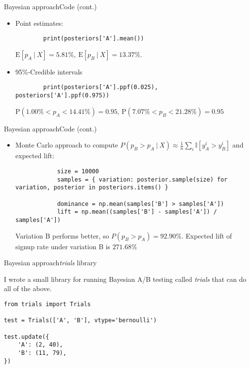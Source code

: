 \documentclass[pdf]{beamer}
\begin{document}
\begin{frame}[fragile]{Bayesian approach}{Code (cont.)}
	
	\begin{itemize}
	\item Point estimates:
	
	\begin{lstlisting}
		print(posteriors['A'].mean())
	\end{lstlisting}
	
	$ \text{E}[p_A~|~X] = 5.81\%,\ \text{E}[p_B~|~X] = 13.37\% $.
	
	\vspace{.5cm}
	
	\item 95\%-Credible intervals
	
	\begin{lstlisting}
		print(posteriors['A'].ppf(0.025), posteriors['A'].ppf(0.975))
	\end{lstlisting}
	
	$ \text{P}(1.00\% < p_A < 14.41\%) = 0.95 $, $\text{P}(7.07\% < p_B < 21.28\%) = 0.95 $
	
	\end{itemize}
	
\end{frame}


\begin{frame}[fragile]{Bayesian approach}{Code (cont.)}

	\begin{itemize}
		\item Monte Carlo approach to compute $P(p_B > p_A~|~X) \approx \frac{1}{n}\sum_i \mathbb{I}[y_A^{i} > y_B^{i}]$ and expected lift:
					
		\begin{lstlisting}
			size = 10000
			samples = { variation: posterior.sample(size) for variation, posterior in posteriors.items() }
			
			dominance = np.mean(samples['B'] > samples['A'])
			lift = np.mean((samples['B'] - samples['A']) / samples['A'])
		\end{lstlisting}
		
		Variation B performs better, so $P(p_B > p_A) = 92.90\%$. Expected lift of signup rate under variation B is $271.68\%$
		
	\end{itemize}

\end{frame}


\begin{frame}[fragile]{Bayesian approach}{\emph{trials} library}

I wrote a small library for running Bayesian A/B testing called \emph{trials} that can do all of the above.

\begin{lstlisting}
from trials import Trials

test = Trials(['A', 'B'], vtype='bernoulli')

test.update({
    'A': (2, 40),
    'B': (11, 79),
})
\end{lstlisting}
\end{frame}
\end{document}
